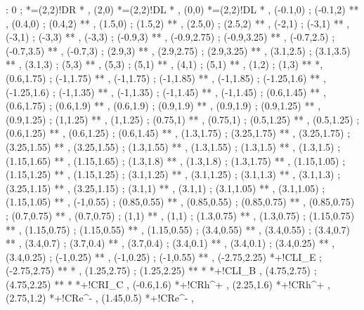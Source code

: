 \documentclass[a4paper,12pt]{article}
\begin{document}
\begin{table}[hbtp]

\xy <1cm,0cm>:
0 ; *=(2,2)!DR\txt{} *\frm{-} ,
(2,0) *=(2,2)!DL\txt{} *\frm{-} ,
(0,0) *=(2,2)!DL\txt{} *\frm{-} ,
(-0.1,0) ; (-0.1,2) **\dir{--} ,
(0.4,0) ; (0.4,2) **\dir{--} ,
(1.5,0) ; (1.5,2) **\dir{--} ,
(2.5,0) ; (2.5,2) **\dir{--} ,
(-2,1) ; (-3,1) **\dir{-} ,
(-3,1) ; (-3,3) **\dir{-} ,
(-3,3) ; (-0.9,3) **\dir{-} ,
(-0.9,2.75) ; (-0.9,3.25) **\dir{-} ,
(-0.7,2.5) ; (-0.7,3.5) **\dir{-} ,
(-0.7,3) ; (2.9,3) **\dir{-} ,
(2.9,2.75) ; (2.9,3.25) **\dir{-} ,
(3.1,2.5) ; (3.1,3.5) **\dir{-} ,
(3.1,3) ; (5,3) **\dir{-} ,
(5,3) ; (5,1) **\dir{-} ,
(4,1) ; (5,1) **\dir{-} ,
(1,2) ; (1,3) **\dir{-} *\dir{*},
(0.6,1.75) ; (-1,1.75) ** ,
(-1,1.75) ; (-1,1.85) ** ,
(-1,1.85) ; (-1.25,1.6) ** ,
(-1.25,1.6) ; (-1,1.35) ** ,
(-1,1.35) ; (-1,1.45) ** ,
(-1,1.45) ; (0.6,1.45) ** ,
(0.6,1.75) ; (0.6,1.9) ** ,
(0.6,1.9) ; (0.9,1.9) ** ,
(0.9,1.9) ; (0.9,1.25) ** ,
(0.9,1.25) ; (1,1.25) ** ,
(1,1.25) ; (0.75,1) ** ,
(0.75,1) ; (0.5,1.25) ** ,
(0.5,1.25) ; (0.6,1.25) ** ,
(0.6,1.25) ; (0.6,1.45) ** ,
%
(1.3,1.75) ; (3.25,1.75) ** ,
(3.25,1.75) ; (3.25,1.55) ** ,
(3.25,1.55) ; (1.3,1.55) ** ,
(1.3,1.55) ; (1.3,1.5) ** ,
(1.3,1.5) ; (1.15,1.65) ** ,
(1.15,1.65) ; (1.3,1.8) ** ,
(1.3,1.8) ; (1.3,1.75) ** ,
%
(1.15,1.05) ; (1.15,1.25) ** ,
(1.15,1.25) ; (3.1,1.25) ** ,
(3.1,1.25) ; (3.1,1.3) ** ,
(3.1,1.3) ; (3.25,1.15) ** ,
(3.25,1.15) ; (3.1,1) ** ,
(3.1,1) ; (3.1,1.05) ** ,
(3.1,1.05) ; (1.15,1.05) ** ,
%
(-1,0.55) ; (0.85,0.55) ** ,
(0.85,0.55) ; (0.85,0.75) ** ,
(0.85,0.75) ; (0.7,0.75) ** ,
(0.7,0.75) ; (1,1) ** ,
(1,1) ; (1.3,0.75) ** ,
(1.3,0.75) ; (1.15,0.75) ** ,
(1.15,0.75) ; (1.15,0.55) ** ,
(1.15,0.55) ; (3.4,0.55) ** ,
(3.4,0.55) ; (3.4,0.7) ** ,
(3.4,0.7) ; (3.7,0.4) ** ,
(3.7,0.4) ; (3.4,0.1) **  ,
(3.4,0.1) ; (3.4,0.25) ** ,
(3.4,0.25) ; (-1,0.25) ** ,
(-1,0.25) ; (-1,0.55) ** ,
(-2.75,2.25) *+!CL{I_{E}} ; (-2.75,2.75) **\dir{-} *\dir{>} ,
(1.25,2.75) ; (1.25,2.25) **\dir{-} *\dir{>} *+!CL{I_{B}} ,
(4.75,2.75) ; (4.75,2.25) **\dir{-} *\dir{>} *+!CR{I_{C}} ,
(-0.6,1.6) *+!CR{h^{+}} ,
(2.25,1.6) *+!CR{h^{+}} ,
(2.75,1.2) *+!CR{e^{-}} ,
(1.45,0.5) *+!CR{e^{-}} ,
\endxy

\end{table}
\end{document}

